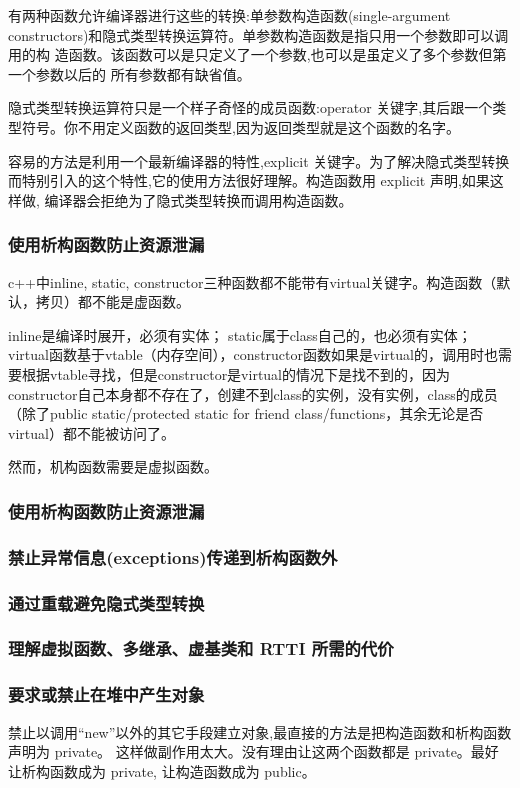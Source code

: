 有两种函数允许编译器进行这些的转换:单参数构造函数(single-argument constructors)和隐式类型转换运算符。单参数构造函数是指只用一个参数即可以调用的构 造函数。该函数可以是只定义了一个参数,也可以是虽定义了多个参数但第一个参数以后的 所有参数都有缺省值。

隐式类型转换运算符只是一个样子奇怪的成员函数:operator 关键字,其后跟一个类
型符号。你不用定义函数的返回类型,因为返回类型就是这个函数的名字。

容易的方法是利用一个最新编译器的特性,explicit 关键字。为了解决隐式类型转换 而特别引入的这个特性,它的使用方法很好理解。构造函数用 explicit 声明,如果这样做, 编译器会拒绝为了隐式类型转换而调用构造函数。

\subsubsection{使用析构函数防止资源泄漏}
c++中inline, static, constructor三种函数都不能带有virtual关键字。构造函数（默认，拷贝）都不能是虚函数。

inline是编译时展开，必须有实体；
static属于class自己的，也必须有实体；
virtual函数基于vtable（内存空间），constructor函数如果是virtual的，调用时也需要根据vtable寻找，但是constructor是virtual的情况下是找不到的，因为constructor自己本身都不存在了，创建不到class的实例，没有实例，class的成员（除了public static/protected static for friend class/functions，其余无论是否virtual）都不能被访问了。

然而，机构函数需要是虚拟函数。

\subsubsection{使用析构函数防止资源泄漏}
\subsubsection{禁止异常信息(exceptions)传递到析构函数外}
\subsubsection{通过重载避免隐式类型转换}
\subsubsection{理解虚拟函数、多继承、虚基类和 RTTI 所需的代价}
\subsubsection{要求或禁止在堆中产生对象}
\begindot
\item[要求在堆中建立对象]
禁止以调用“new”以外的其它手段建立对象,最直接的方法是把构造函数和析构函数声明为 private。 这样做副作用太大。没有理由让这两个函数都是 private。最好让析构函数成为 private, 让构造函数成为 public。

